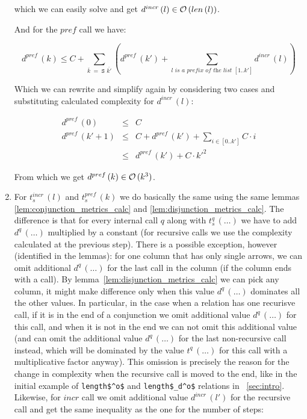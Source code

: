 \begin{enumerate}
which we can easily solve and get $d^{incr}\,(l) \in \mathcal{O}\,(len\,(l))$.

And for the $pref$ call we have:

\[ d^{pref}\,(k) \le C + \displaystyle\sum\limits_{\overline{k} \;=\; \texttt{S $\overline{k'}$}} (d^{pref}\,(k') + \displaystyle\sum\limits_{\textit{$l$ is a prefix of the list $[1..k']$}} d^{incr}\,(l)) \]

Which we can rewrite and simplify again by considering two cases and substituting calculated complexity for $d^{incr}\,(l)$:

\[
\begin{array}{lcl}
d^{pref}\,(0) &\le& C \\
d^{pref}\,(k' + 1) &\le& C + d^{pref}\,(k') + \displaystyle\sum\limits_{i \in [0..k']} C \cdot i \\
            &\le& d^{pref}\,(k') + C \cdot k'^2 
\end{array} \]

From which we get $d^{pref}\,(k) \in \mathcal{O}\,(k^3)$.

\item For $t_s^{incr}\,(l)$ and $t_s^{pref}\,(k)$ we do basically the same using the same lemmas \ref{lem:conjunction_metrics_calc} and \ref{lem:disjunction_metrics_calc}. The difference is that for every internal call $q$ along with $t_s^q\,(\dots)$ we have to add $d^q\,(\dots)$
  multiplied by a constant (for recursive calls we use the complexity calculated at the previous step). There is a possible exception, however (identified in the lemmas): for one column that has only single arrows, we can omit additional $d^q\,(\dots)$ for the last call in the column (if the column ends with a call).
  By lemma~\ref{lem:disjunction_metrics_calc} we can pick any column, it might make difference only when this value $d^q\,(\dots)$ dominates all the other values. In particular, in the case when a relation has one recurisve call, if it is in the end of a conjunction we omit additional value $d^q\,(\dots)$ for this call, and when it is not in the end we can not omit this additional value (and can omit the additional value $d^q\,(\dots)$ for the last non-recursive call instead, which will be dominated by the value $t^q\,(\dots)$ for this call with a multiplicative factor anyway). This omission is precisely the reason for the change in complexity when the recursive call is moved to the end, like in the initial example of \lstinline|length$^o$| and \lstinline|length$_d^o$| relations in \sectionword~\ref{sec:intro}. Likewise, for $incr$ call we omit additional value $d^{incr}\,(l')$ for the recursive call and get the same inequality as the one for the number of steps:


\end{enumerate}
